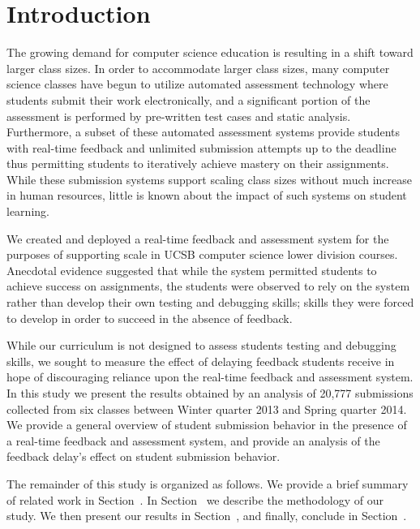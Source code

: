 \section{Introduction}
The growing demand for computer science education is resulting in a shift
toward larger class sizes. In order to accommodate larger class sizes, many
computer science classes have begun to utilize automated assessment technology
where students submit their work electronically, and a significant portion of
the assessment is performed by pre-written test cases and static
analysis. Furthermore, a subset of these automated assessment systems provide
students with real-time feedback and unlimited submission attempts up to the
deadline thus permitting students to iteratively achieve mastery on their
assignments. While these submission systems support scaling class sizes without
much increase in human resources, little is known about the impact of such
systems on student learning.

We created and deployed a real-time feedback and assessment system for the
purposes of supporting scale in UCSB computer science lower division
courses. Anecdotal evidence suggested that while the system permitted students
to achieve success on assignments, the students were observed to rely on the
system rather than develop their own testing and debugging skills; skills they
were forced to develop in order to succeed in the absence of feedback.

While our curriculum is not designed to assess students testing and debugging
skills, we sought to measure the effect of delaying feedback students receive
in hope of discouraging reliance upon the real-time feedback and assessment
system. In this study we present the results obtained by an analysis of 20,777
submissions collected from six classes between Winter quarter 2013 and Spring
quarter 2014. We provide a general overview of student submission behavior in
the presence of a real-time feedback and assessment system, and provide an
analysis of the feedback delay's effect on student submission behavior.

The remainder of this study is organized as follows. We provide a brief summary
of related work in Section~. In
Section~ we describe the methodology of our study. We
then present our results in Section~, and finally,
conclude in Section~.
